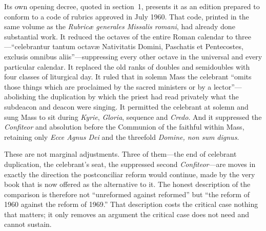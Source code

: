Its own opening decree, quoted in section~1, presents it as an edition prepared to conform to a code of rubrics approved in July 1960. That code, printed in the same volume as the \emph{Rubricæ generales Missalis romani}, had already done substantial work. It reduced the octaves of the entire Roman calendar to three---``celebrantur tantum octavæ Nativitatis Domini, Paschatis et Pentecostes, exclusis omnibus aliis''---suppressing every other octave in the universal and every particular calendar. It replaced the old ranks of doubles and semidoubles with four classes of liturgical day. It ruled that in solemn Mass the celebrant ``omits those things which are proclaimed by the sacred ministers or by a lector''---abolishing the duplication by which the priest had read privately what the subdeacon and deacon were singing. It permitted the celebrant at solemn and sung Mass to sit during \emph{Kyrie}, \emph{Gloria}, sequence and \emph{Credo}. And it suppressed the \emph{Confiteor} and absolution before the Communion of the faithful within Mass, retaining only \emph{Ecce Agnus Dei} and the threefold \emph{Domine, non sum dignus}.

These are not marginal adjustments. Three of them---the end of celebrant duplication, the celebrant's seat, the suppressed second \emph{Confiteor}---are moves in exactly the direction the postconciliar reform would continue, made by the very book that is now offered as the alternative to it. The honest description of the comparison is therefore not ``unreformed against reformed'' but ``the reform of 1960 against the reform of 1969.'' That description costs the critical case nothing that matters; it only removes an argument the critical case does not need and cannot sustain.
